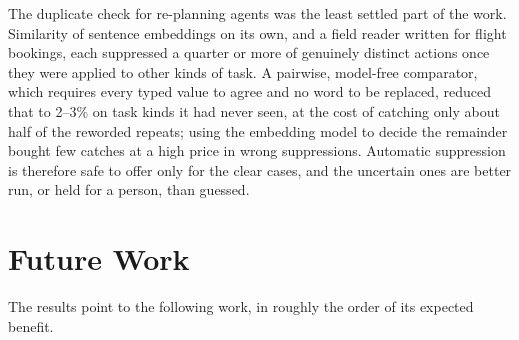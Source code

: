 The duplicate check for re-planning agents was the least settled part of the
work. Similarity of sentence embeddings on its own, and a field reader
written for flight bookings, each suppressed a quarter or more of genuinely
distinct actions once they were applied to other kinds of task. A pairwise,
model-free comparator, which requires every typed value to agree and no word
to be replaced, reduced that to 2--3\% on task kinds it had never seen, at the
cost of catching only about half of the reworded repeats; using the
embedding model to decide the remainder bought few catches at a high price in
wrong suppressions. Automatic suppression is therefore safe to offer only for
the clear cases, and the uncertain ones are better run, or held for a
person, than guessed.

\section{Future Work}

The results point to the following work, in roughly the order of its
expected benefit.

